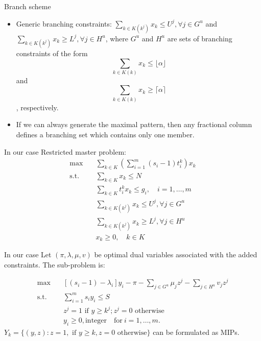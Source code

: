     \begin{frame}{Branch scheme}
      \begin{itemize}
        \item Generic branching constraints:
        $\sum_{k \in K(k^j)} x_{k} \leq U^{j}, \forall j \in G^u$ and $\sum_{k \in K(k^j)} x_{k} \geq L^{j}, \forall j \in H^u$,
        where $G^u$ and $H^u$ are sets of branching constraints of the form
        \begin{equation}
         \sum_{k \in {K(k)}} x_{k} \leq\lfloor\alpha\rfloor
        \end{equation} and
        \begin{equation}
        \sum_{k \in {K(k)}} x_{k} \geq \lceil\alpha\rceil
        \end{equation}, respectively.
        \vspace{10pt}
        \item If we can always generate the maximal pattern, then any fractional column defines a branching set which contains only one member.
        \vspace{10pt}
      \end{itemize}
    \end{frame}

    \begin{frame}{In our case}
      Restricted master problem:
      \[\begin{split}\mbox{max}\quad & \sum_{k\in K}(\sum_{i=1}^m (s_i-1)t_i^k) x_{k}\\
      \mbox{s.t.} \quad & \sum_{k \in K} x_{k} \leq N \\
      & \sum_{k \in K} t_i^k x_k \leq g_i,\quad i=1,\ldots,m\\
      & \sum_{k \in K(k^j)} x_{k} \leq U^{j}, \forall j \in G^u \\
      & \sum_{k \in K(k^j)} x_{k} \geq L^{j}, \forall j \in H^u \\
      & x_{k} \geq 0, \quad k \in K
      \end{split}\]
    \end{frame}

    \begin{frame}{In our case}
      Let $(\pi,\lambda,\mu,v)$ be optimal dual variables associated with the added constraints.
        The sub-problem is:

        \[\begin{split}\mbox{max}\quad & \left[(s_i-1) -\lambda_i\right] y_{i}- \pi - \sum_{j\in G^u}\mu_j z^j - \sum_{j\in H^u}v_j z^j \\
        \mbox{s.t.} \quad & \sum_{i=1}^m s_i y_i \leq S  \\
        & z^j =1 \mbox{ if } y \geq k^j; z^j =0 \mbox{ otherwise}  \\
        & y_i \geq 0, \mbox{integer}\quad \mbox{for}~ i=1,\ldots,m.
        \end{split}\]
        $Y_k = \{(y,z): z=1,\text{ if } y \geq k,z=0 \text{ otherwise} \}$ can be formulated as MIPs.
    \end{frame}

